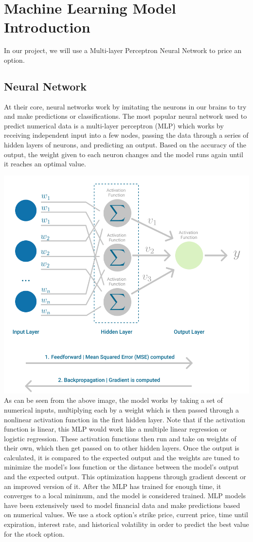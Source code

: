 \section{Machine Learning Model Introduction}
In our project, we will use a Multi-layer Perceptron Neural Network to price an option. 
\subsection{Neural Network}
At their core, neural networks work by imitating the neurons in our brains to try and make predictions or classifications. The most popular neural network used to predict numerical data is a multi-layer perceptron (MLP) which works by receiving independent input into a few nodes, passing the data through a series of hidden layers of neurons, and predicting an output. Based on the accuracy of the output, the weight given to each neuron changes and the model runs again until it reaches an optimal value. 

\includegraphics[width=.5\textwidth]{graphics/MLNNGraphic.png}
\\
As can be seen from the above image, the model works by taking a set of numerical inputs, multiplying each by a weight which is then passed through a nonlinear activation function in the first hidden layer. Note that if the activation function is linear, this MLP would work like a multiple linear regression or logistic regression. These activation functions then run and take on weights of their own, which then get passed on to other hidden layers. Once the output is calculated, it is compared to the expected output and the weights are tuned to minimize the model’s loss function or the distance between the model's output and the expected output. This optimization happens through gradient descent or an improved version of it. After the MLP has trained for enough time, it converges to a local minimum, and the model is considered trained. MLP models have been extensively used to model financial data and make predictions based on numerical values. We use a stock option’s strike price, current price, time until expiration, interest rate, and historical volatility in order to predict the best value for the stock option. \cite{MLIntro}

